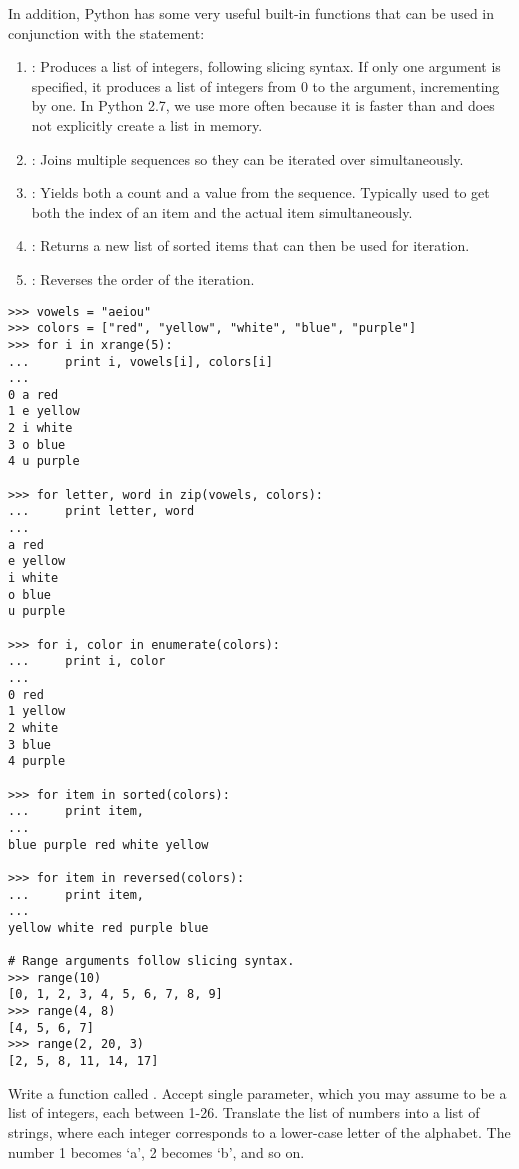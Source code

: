 In addition, Python has some very useful built-in functions that can be used in conjunction with the  statement:
\begin{enumerate}
\item {}: Produces a list of integers, following slicing syntax. If only one argument is specified, it produces a list of integers from 0 to the argument, incrementing by one.
In Python 2.7, we use  more often because it is faster than  and does not explicitly create a list in memory.
\item {}: Joins multiple sequences so they can be iterated over simultaneously.
\item {}: Yields both a count and a value from the sequence. Typically used to get both the index of an item and the actual item simultaneously.
\item {}: Returns a new list of sorted items that can then be used for iteration.
\item {}: Reverses the order of the iteration.
\end{enumerate}

\begin{lstlisting}
>>> vowels = "aeiou"
>>> colors = ["red", "yellow", "white", "blue", "purple"]
>>> for i in xrange(5):
...     print i, vowels[i], colors[i]
... 
0 a red
1 e yellow
2 i white
3 o blue
4 u purple

>>> for letter, word in zip(vowels, colors):
...     print letter, word
... 
a red
e yellow
i white
o blue
u purple

>>> for i, color in enumerate(colors):
...     print i, color
... 
0 red
1 yellow
2 white
3 blue
4 purple

>>> for item in sorted(colors):
...     print item,
...
blue purple red white yellow

>>> for item in reversed(colors):
...     print item,
...
yellow white red purple blue

# Range arguments follow slicing syntax.
>>> range(10)
[0, 1, 2, 3, 4, 5, 6, 7, 8, 9]
>>> range(4, 8)
[4, 5, 6, 7]
>>> range(2, 20, 3)
[2, 5, 8, 11, 14, 17]
\end{lstlisting}

\begin{problem} %
Write a function called .
Accept single parameter, which you may assume to be a list of integers, each between 1-26.
Translate the list of numbers into a list of strings, where each integer corresponds to a lower-case letter of the alphabet.
The number 1 becomes `a', 2 becomes `b', and so on.
\end{problem}

